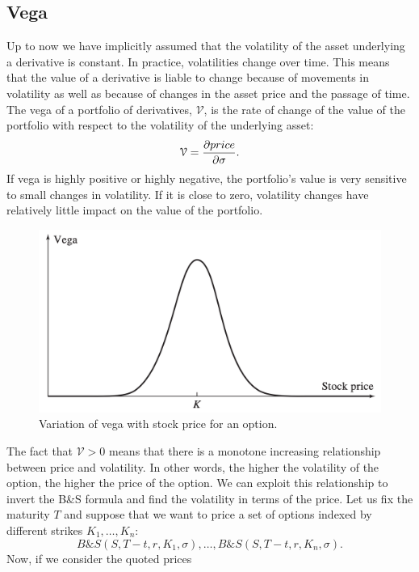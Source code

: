 \subsection{Vega}
Up to now we have implicitly assumed that the volatility of the asset underlying a derivative is constant. In practice, volatilities change over time. This means that the value of a derivative is liable to change because of movements in volatility as well as because of changes in the asset price and the passage of time.\\
The vega of a portfolio of derivatives, $\mathcal{V}$, is the rate of change of the value of the portfolio with respect to the volatility of the underlying asset:
\begin{equation}
    \mathcal{V} = \pdv{price}{\sigma}.
\end{equation}
If vega is highly positive or highly negative, the portfolio’s value is very sensitive to small changes in volatility. If it is close to zero, volatility changes have relatively little impact on the value of the portfolio.
\begin{figure}[htp]
    \centering
    \includegraphics[scale=0.2]{fig/tmp/fig17.png}
    \caption{Variation of vega with stock price for an option.}
    \label{fig:vega}
\end{figure}
\newline The fact that $\mathcal{V}>0$ means that there is a monotone increasing relationship between price and volatility. In other words, the higher the volatility of the option, the higher the price of the option. We can exploit this relationship to invert the B\&S formula and find the volatility in terms of the price. Let us fix the maturity $T$ and suppose that we want to price a set of options indexed by different strikes $K_1,\dots,K_n$: $$B\&S(S,T-t,r,K_1,\sigma),\dots,B\&S(S,T-t,r,K_n,\sigma).$$
Now, if we consider the quoted prices
